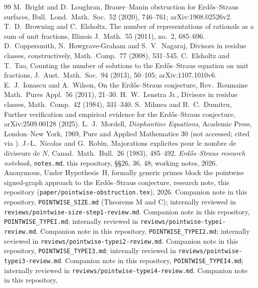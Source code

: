 \documentclass[11pt,reqno]{amsart}
\theoremstyle{definition}
\begin{document}
\begin{thebibliography}{99}
 M.~Bright and D.~Loughran, Brauer--Manin obstruction for
Erd\H{o}s--Straus surfaces, Bull.\ Lond.\ Math.\ Soc.\ 52 (2020), 746--761;
arXiv:1908.02526v2.
 T.~D.~Browning and C.~Elsholtz, The number of representations
of rationals as a sum of unit fractions, Illinois J.\ Math.\ 55 (2011), no.~2,
685--696.
 D.~Coppersmith, N.~Howgrave-Graham and S.~V.~Nagaraj,
Divisors in residue classes, constructively, Math.\ Comp.\ 77 (2008),
531--545.
 C.~Elsholtz and T.~Tao, Counting the number of solutions to the
Erd\H{o}s--Straus equation on unit fractions, J.\ Aust.\ Math.\ Soc.\ 94
(2013), 50--105; arXiv:1107.1010v6.
 E.~J.~Ionascu and A.~Wilson, On the Erd\H{o}s--Straus
conjecture, Rev.\ Roumaine Math.\ Pures Appl.\ 56 (2011), 21--30.
 H.~W.~Lenstra Jr., Divisors in residue classes, Math.\
Comp.\ 42 (1984), 331--340.
 S.~Mihnea and B.~C.~Dumitru, Further verification and empirical
evidence for the Erd\H{o}s--Straus conjecture, arXiv:2509.00128 (2025).
\bibitem{Mordell} L.~J.~Mordell, \emph{Diophantine Equations}, Academic
Press, London--New York, 1969, Pure and Applied Mathematics 30 (not
accessed; cited via \cite{ET}).
 J.-L.~Nicolas and G.~Robin, Majorations explicites pour le
nombre de diviseurs de $N$, Canad.\ Math.\ Bull.\ 26 (1983), 485--492.
\bibitem{Notes} \emph{Erd\H{o}s--Straus research notebook},
\texttt{notes.md}, this repository, \S\S26, 36, 48; working notes, 2026.
\bibitem{PObs} Anonymous, Under Hypothesis~H, formally generic primes
block the pointwise signed-graph approach to the Erd\H{o}s--Straus
conjecture, research note, this repository
(\texttt{paper/pointwise-obstruction.tex}), 2026.
 Companion note in this repository, \texttt{POINTWISE\_SIZE.md}
(Theorems M and C); internally reviewed in
\texttt{reviews/pointwise-size-step1-review.md}.
 Companion note in this repository,
\texttt{POINTWISE\_TYPEI.md}; internally reviewed in
\texttt{reviews/pointwise-typei-review.md}.
 Companion note in this repository,
\texttt{POINTWISE\_TYPEI2.md}; internally reviewed in
\texttt{reviews/pointwise-typei2-review.md}.
 Companion note in this repository,
\texttt{POINTWISE\_TYPEI3.md}; internally reviewed in
\texttt{reviews/pointwise-typei3-review.md}.
 Companion note in this repository,
\texttt{POINTWISE\_TYPEI4.md}; internally reviewed in
\texttt{reviews/pointwise-typei4-review.md}.
 Companion note in this repository,

\end{thebibliography}
\end{document}
